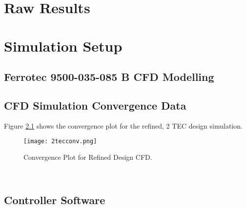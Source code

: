 \appendix
\chapter{Raw Results}
\label{cha:appendix}

\chapter{Simulation Setup}

\section{Ferrotec 9500-035-085 B CFD Modelling}
\label{cha:app_TEC_CFD}

\section{CFD Simulation Convergence Data}
\label{cha:CFDconverg}

Figure \ref{fig:2tecconv} shows the convergence plot for the refined, 2 TEC design simulation.

\begin{figure}[!htb]
	\centering
	\texttt{[image: 2tecconv.png]}
	\caption[Convergence Plot for Refined Design CFD.]{Convergence Plot for Refined Design CFD.}
	\label{fig:2tecconv}
\end{figure} 
\FloatBarrier

\section{Controller Software}
\label{controllerimp}





%
